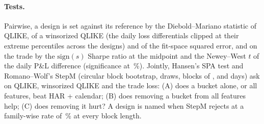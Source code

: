\paragraph{Tests.} Pairwise, a design is set against its reference by the Diebold--Mariano
statistic of QLIKE, of a winsorized QLIKE (the daily loss differentials clipped at their
extreme percentiles across the designs) and of the fit-space squared error, and on the trade
by the $\mathrm{sign}(s)$ Sharpe ratio at the midpoint and the Newey--West $t$ of the daily
P\&L difference (significance at \bkSigPct\,\%). Jointly, Hansen's SPA test and
Romano--Wolf's StepM (circular block bootstrap, \bkBoot{} draws, blocks of \bkBlockA,
\bkBlockB{} and \bkBlockC{} days) ask on QLIKE, winsorized QLIKE and the trade loss:
(A) does a bucket alone, or all features, beat HAR + calendar; (B) does removing a bucket
from all features help; (C) does removing it hurt? A design is named when StepM rejects at a
family-wise rate of \bkFwer\,\% at every block length.

